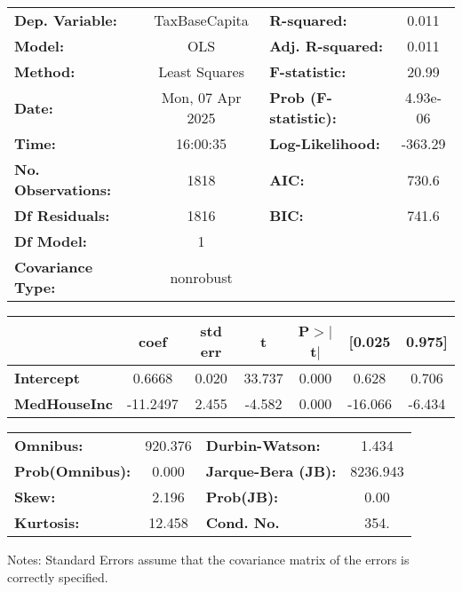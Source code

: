 \begin{center}
\begin{tabular}{lclc}
\toprule
\textbf{Dep. Variable:}    &  TaxBaseCapita   & \textbf{  R-squared:         } &     0.011   \\
\textbf{Model:}            &       OLS        & \textbf{  Adj. R-squared:    } &     0.011   \\
\textbf{Method:}           &  Least Squares   & \textbf{  F-statistic:       } &     20.99   \\
\textbf{Date:}             & Mon, 07 Apr 2025 & \textbf{  Prob (F-statistic):} &  4.93e-06   \\
\textbf{Time:}             &     16:00:35     & \textbf{  Log-Likelihood:    } &   -363.29   \\
\textbf{No. Observations:} &        1818      & \textbf{  AIC:               } &     730.6   \\
\textbf{Df Residuals:}     &        1816      & \textbf{  BIC:               } &     741.6   \\
\textbf{Df Model:}         &           1      & \textbf{                     } &             \\
\textbf{Covariance Type:}  &    nonrobust     & \textbf{                     } &             \\
\bottomrule
\end{tabular}
\begin{tabular}{lcccccc}
                     & \textbf{coef} & \textbf{std err} & \textbf{t} & \textbf{P$> |$t$|$} & \textbf{[0.025} & \textbf{0.975]}  \\
\midrule
\textbf{Intercept}   &       0.6668  &        0.020     &    33.737  &         0.000        &        0.628    &        0.706     \\
\textbf{MedHouseInc} &     -11.2497  &        2.455     &    -4.582  &         0.000        &      -16.066    &       -6.434     \\
\bottomrule
\end{tabular}
\begin{tabular}{lclc}
\textbf{Omnibus:}       & 920.376 & \textbf{  Durbin-Watson:     } &    1.434  \\
\textbf{Prob(Omnibus):} &   0.000 & \textbf{  Jarque-Bera (JB):  } & 8236.943  \\
\textbf{Skew:}          &   2.196 & \textbf{  Prob(JB):          } &     0.00  \\
\textbf{Kurtosis:}      &  12.458 & \textbf{  Cond. No.          } &     354.  \\
\bottomrule
\end{tabular}
\end{center}

Notes: \newline
 [1] Standard Errors assume that the covariance matrix of the errors is correctly specified.